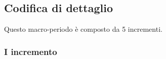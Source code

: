 \documentclass[../piano-di-progetto.tex]{subfiles}
\begin{document}
\subsection{Codifica di dettaglio}
Questo macro-periodo è composto da 5 incrementi.

\subsubsection{I incremento}
\end{document}
